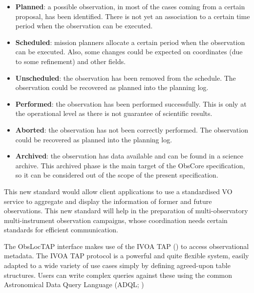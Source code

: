 \documentclass[11pt,a4paper]{ivoa}
\begin{document}
\begin{itemize}
	\item{\textbf{Planned}: a possible observation, in most of the cases coming
  from a certain proposal, has been identified. There is not yet an association
  to a certain time period when the observation can be executed.}

	\item{\textbf{Scheduled}: mission planners allocate a certain period when the
	observation can be executed. Also, some changes could be expected on
  coordinates (due to some refinement) and other fields.}

	\item{\textbf{Unscheduled}: the observation has been removed from the schedule.   	     
	The observation could be recovered as planned into the planning log.}

	\item{\textbf{Performed}: the observation has been performed successfully.
  This is only at the operational level as there is not guarantee of scientific
  results.}

	\item{\textbf{Aborted}: the observation has not been correctly performed. 
	The observation could be recovered as planned into the planning log.}

	\item{\textbf{Archived}: the observation has data available and can be found
  in a science archive. This archived phase is the main target of the ObsCore
  specification, so it can be considered out of the scope of the present
  specification.}

\end{itemize}

This new standard would allow client applications to use a standardised VO
service to aggregate and display the information of former and future
observations. This new standard will help in the preparation of
multi-observatory multi-instrument observation campaigns, whose
coordination needs certain standards for efficient communication.

The ObsLocTAP interface makes use of the IVOA TAP (\citealt{2019ivoa.spec.0927D})
to access observational metadata. The IVOA TAP protocol is a powerful and quite
flexible system, easily adapted to a wide variety of use cases simply by
defining agreed-upon table structures. Users can write complex queries against these
using the common Astronomical Data Query Language (ADQL; \citealt{2008ivoa.spec.1030O})
\end{document}
